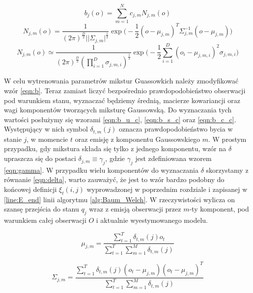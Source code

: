 \documentclass[shortabstract, mgr]{iithesis}
\begin{document}
	   \begin{equation}
		   	b_j(o) = \sum_{m=1}^N c_{j,m} N_{j,m}(o)
		   	\label{eqn:GMM}
	   \end{equation}
	   \begin{equation}
		   N_{j,m}(o)=\frac{1}{(2\pi)^{\frac{D}{2}}||\Sigma_{j,m}|^{\frac{1}{2}}}\exp\bigg( -\frac{1}{2}(o-\mu_{j,m})^T\Sigma_{j,m}^{-1}(o-\mu_{j,m}) \bigg)
		   \label{eqn:normal_distribution}
	   \end{equation}	
	   \begin{equation}
		   N_{j,m}(o)\simeq\frac{1}{(2\pi)^{\frac{D}{2}}(\prod_{i=1}^D\sigma_{j,m,i})^{\frac{1}{2}}}\exp\bigg( -\frac{1}{2}\sum_{i=1}^D(o_i-\mu_{j,m,i})^2\sigma_{j,m,i} \bigg)
	   \label{eqn:normal_distribution_simple}
	   \end{equation}
	   
	   W celu wytrenowania parametrów mikstur Guassowkich należy zmodyfikować wzór \ref{eqn:b}. Teraz zamiast liczyć bezpośrednio prawdopodobieństwo obserwacji pod warunkiem stanu, wyznaczać będziemy średnią, macierze kowariancji oraz wagi komponentów tworzących miksturę Gaussowską. Do wyznaczania tych wartości posłużymy się wzorami \ref{eqn:b_u_c}, \ref{eqn:b_s_c} oraz \ref{eqn:b_c_c}. Występujący w nich symbol $\delta_{t,m}(j)$ oznacza prawdopodobieństwo bycia w stanie $j$, w momencie $t$ oraz emisję z komponentu Gaussowskiego $m$. W prostym przypadku, gdy mikstura składa się tylko z jednego komponentu, wzór na $\delta$ upraszcza się do postaci $\delta_{j,m} \equiv \gamma_j$, gdzie $\gamma_j$ jest zdefiniowana wzorem \ref{eqn:gamma}. W przypadku wielu komponentów do wyznaczania $\delta$ skorzystamy z równanie \ref{eqn:delta}, warto zauważyć, że jest to wzór bardzo podobny do końcowej definicji $\xi _t(i,j)$ wyprowadzonej w poprzednim rozdziale i zapisanej w \ref{line:E_end} linii algorytmu \ref{alg:Baum_Welch}. W rzeczywistości wylicza on szansę przejścia do stanu $q_j$ wraz z emisją obserwacji przez $m$-ty komponent, pod warunkiem całej obserwacji $O$ i aktualnie wyestymowanego modelu.
	   
	   \begin{equation}
	   \mu_{j,m}=\frac{\sum_{t=1}^T\delta_{t,m}(j)o_t}{\sum_{t=1}^T\sum_{m=1}^M\delta_{t,m}(j)}
	   \label{eqn:b_u_c}
	   \end{equation}
	   
	   \begin{equation}
	   \Sigma_{j,m}=\frac{\sum_{t=1}^T\delta_{t,m}(j)(o_t-\mu_{j,m})(o_t-\mu_{j,m})^T}{\sum_{t=1}^T\sum_{m=1}^M\delta_{t,m}(j)}
	   \label{eqn:b_s_c}
	   \end{equation}
	   
\end{document}
